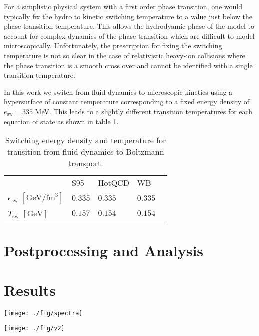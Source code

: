 \documentclass[aps,prc,reprint,amsmath,nofootinbib,superscriptaddress]{revtex4-1}
\begin{document}
For a simplistic physical system with a first order phase transition, one would typically fix the hydro to kinetic switching temperature to a value just below the phase 
transition temperature. This allows the hydrodyamic phase of the model to account for complex dynamics of the phase transition which are difficult to model 
microscopically. Unfortunately, the prescription for fixing the switching temperature is not so clear in the case of relativistic heavy-ion collisions where the 
phase transition is a smooth cross over and cannot be identified with a single transition temperature. 

In this work we switch from fluid dynamics to microscopic kinetics using a hypersurface of constant temperature corresponding to a fixed energy density of 
$e_\text{sw}= 335$ MeV. This leads to a slightly different transition temperatures for each equation of state as shown in table \ref{tab:tsw}.

\begin{table}
  \caption{
    \label{tab:tsw}
    Switching energy density and temperature for transition from fluid dynamics to Boltzmann transport.
  }
  \begin{ruledtabular}
  \begin{tabular}{lllll}
    & S95 & HotQCD & WB & \\
    \noalign{\smallskip}\hline\noalign{\smallskip}
    $e_\text{sw}$ $[\text{GeV}/\text{fm}^3]$ & $0.335$ & $0.335$ & $0.335$ &  \\
    $T_\text{sw}$ $[\text{GeV}]$ & $0.157$ & $0.154$ & $0.154$ & \\
  \end{tabular}
  \end{ruledtabular}
\end{table}


\section{Postprocessing and Analysis}

\section{Results}

\begin{figure*}[t]
  \texttt{[image: ./fig/spectra]}
  \caption{
    \label{fig:spectra}
  }
\end{figure*}

\begin{figure*}[t]
  \texttt{[image: ./fig/v2]}
  \caption{
    \label{fig:spectra}
  }
\end{figure*}
\end{document}
